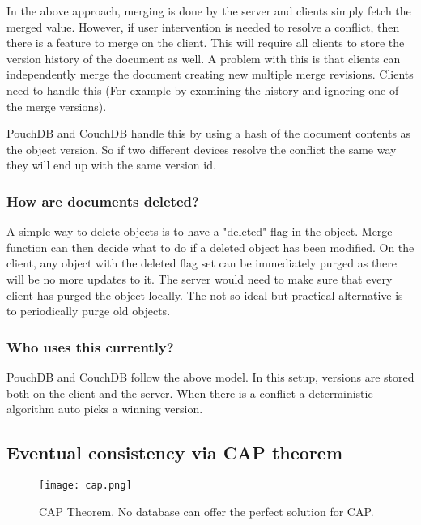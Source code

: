 In the above approach, merging is done by the server and clients simply fetch the merged value. 
However, if user intervention is needed to resolve a conflict, then there is a feature to merge on the client.
This will require all clients to store the version history of the document as well. A problem with this is that clients can independently merge the document creating new multiple merge revisions.
Clients need to handle this (For example by examining the history and ignoring one of the merge versions).

PouchDB and CouchDB handle this by using a hash of the document contents as the object version. So if two 
different devices resolve the conflict the same way they will end up with the same version id.

\subsubsection*{How are documents deleted?}

A simple way to delete objects is to have a "deleted" flag in the object. 
Merge function can then decide what to do if a deleted object has been modified. 
On the client, any object with the deleted flag set can be immediately purged as there will be no more updates to it. The server would need to make sure that every client has purged the object locally. 
The not so ideal but practical alternative is to periodically purge old objects.

\subsubsection*{Who uses this currently?}

PouchDB and CouchDB follow the above model. In this setup, versions are stored both on the client and the server. When there is a conflict a deterministic algorithm auto picks a winning version.~\cite{HasuraOfflineFirst}

\subsection{Eventual consistency via CAP theorem}

\begin{figure}[h!]
    \begin{center}
        \texttt{[image: cap.png]}
    \end{center}
    \caption{CAP Theorem. No database can offer the perfect solution for CAP.}
    \label{fig:cap}
\end{figure}

